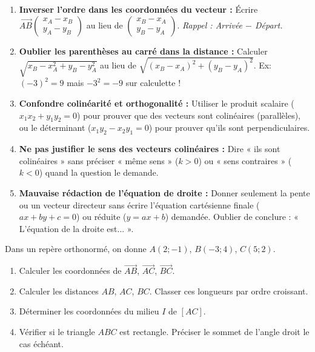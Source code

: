 \documentclass[11pt]{article}
\begin{document}
\begin{attention}
    \begin{enumerate}
        \item \textbf{Inverser l'ordre dans les coordonnées du vecteur :} Écrire $\overrightarrow{AB}\begin{pmatrix} x_A-x_B \\ y_A-y_B \end{pmatrix}$ au lieu de $\begin{pmatrix} x_B-x_A \\ y_B-y_A \end{pmatrix}$. \textit{Rappel : Arrivée $-$ Départ.}
        \item \textbf{Oublier les parenthèses au carré dans la distance :} Calculer $\sqrt{x_B-x_A^2 + y_B-y_A^2}$ au lieu de $\sqrt{(x_B-x_A)^2+(y_B-y_A)^2}$. Ex: $(-3)^2=9$ mais $-3^2=-9$ sur calculette !
        \item \textbf{Confondre colinéarité et orthogonalité :} Utiliser le produit scalaire ($x_1x_2+y_1y_2=0$) pour prouver que des vecteurs sont colinéaires (parallèles), ou le déterminant ($x_1y_2-x_2y_1=0$) pour prouver qu'ils sont perpendiculaires.
        \item \textbf{Ne pas justifier le sens des vecteurs colinéaires :} Dire « ils sont colinéaires » sans préciser « même sens » ($k>0$) ou « sens contraires » ($k<0$) quand la question le demande.
        \item \textbf{Mauvaise rédaction de l'équation de droite :} Donner seulement la pente ou un vecteur directeur sans écrire l'équation cartésienne finale ($ax+by+c=0$) ou réduite ($y=ax+b$) demandée. Oublier de conclure : « L'équation de la droite est... ».
    \end{enumerate}
\end{attention}

\begin{exercice}
    Dans un repère orthonormé, on donne $A(2;-1)$, $B(-3;4)$, $C(5;2)$.
    \begin{enumerate}
        \item Calculer les coordonnées de $\overrightarrow{AB}$, $\overrightarrow{AC}$, $\overrightarrow{BC}$.
        \item Calculer les distances $AB$, $AC$, $BC$. Classer ces longueurs par ordre croissant.
        \item Déterminer les coordonnées du milieu $I$ de $[AC]$.
        \item Vérifier si le triangle $ABC$ est rectangle. Préciser le sommet de l'angle droit le cas échéant.
    \end{enumerate}
\end{exercice}
\end{document}
